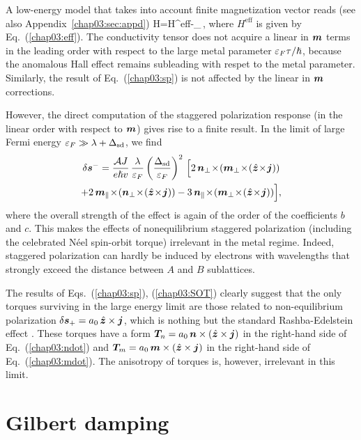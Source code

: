 A low-energy model that takes into account finite magnetization vector reads (see also Appendix~\ref{chap03:sec:appd})
\be
\label{chap03:full}
H=H^\textrm{eff}-\Delta_{}\,\cdot\bb{\sigma},
\e
where $H^\textrm{eff}$ is given by Eq.~(\ref{chap03:eff}). The conductivity tensor does not acquire a linear in $\boldsymbol{m}$ terms in the leading order with respect to the large metal parameter $\varepsilon_F\tau/\hslash$, because the anomalous Hall effect remains subleading with respet to the metal parameter. Similarly, the result of Eq.~(\ref{chap03:sp}) is not affected by the linear in $\boldsymbol{m}$ corrections. 

However, the direct computation of the staggered polarization response (in the linear order with respect to $\boldsymbol{m}$) gives rise to a finite result. In the limit of large Fermi energy $\varepsilon_F\gg \lambda+\Delta_{\text{sd}}$, we find 
\begin{multline}
\delta\bb{s}^-= \frac{\mathcal{A}J}{e\hslash v}\,\frac{\lambda}{\ep_F}
\lt(\frac{\Delta_{\text{sd}}}{\ep_F}\rt)^2\,
\Big[2\,\bb{n}_{\perp} \!\times\!(\bb{m}_{\perp} \!\times\! (\hat{\bb{z}}\!\times\!\bb{j}))
\\
+2\,\bb{m}_{\parallel} \!\times\!(\bb{n}_{\perp} \!\times\! (\hat{\bb{z}}\!\times\!\bb{j})) -3\,\bb{n}_{\parallel}\!\times\! (\bb{m}_{\perp}\! \times\! (\hat{\bb{z}}\!\times\!\bb{j}))\n \Big],
\label{chap03:stagg}
\end{multline}
where the overall strength of the effect is again of the order of the coefficients $b$ and $c$. This makes the effects of nonequilibrium staggered polarization (including the celebrated N\'eel spin-orbit torque) irrelevant in the metal regime. Indeed, staggered polarization can hardly be induced by electrons with wavelengths that strongly exceed the distance between $A$ and $B$ sublattices.  

The results of Eqs.~(\ref{chap03:sp}), (\ref{chap03:SOT}) clearly suggest that the only torques surviving in the large energy limit are those related to non-equilibrium polarization $\delta\boldsymbol{s}_+=a_0 \,\hat{\boldsymbol{z}}\times\boldsymbol{j}$, which is nothing but the standard Rashba-Edelstein effect \cite{edelstein_spin_1990}. These torques have a form $\boldsymbol{T}_n= a_0 \,\boldsymbol{n}\times(\hat{\boldsymbol{z}}\times\boldsymbol{j})$ in the right-hand side of Eq.~(\ref{chap03:ndot}) and $\boldsymbol{T}_m= a_0 \,\boldsymbol{m}\times(\hat{\boldsymbol{z}}\times\boldsymbol{j})$ in the right-hand side of Eq.~(\ref{chap03:mdot}). The anisotropy of torques is, however, irrelevant in this limit.  

\section{Gilbert damping}\label{chap03:sec:gd}

